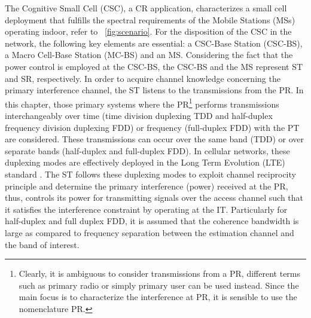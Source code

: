 The Cognitive Small Cell (CSC), a CR application, characterizes a small cell deployment that fulfills the spectral requirements of the Mobile Stations (MSs) operating indoor, refer to \figurename~\ref{fig:scenario}.
For the disposition of the CSC in the network, the following key elements are essential: a CSC-Base Station (CSC-BS), a Macro Cell-Base Station (MC-BS) and an MS. 
Considering the fact that the power control is employed at the CSC-BS, the CSC-BS and the MS represent ST and SR, respectively. In order to acquire channel knowledge concerning the primary interference channel, the ST listens to the transmissions from the PR. In this chapter, those primary systems where the PR\footnote{Clearly, it is ambiguous to consider transmissions from a PR, different terms such as primary radio or simply primary user can be used instead. Since the main focus is to characterize the interference at PR, it is sensible to use the nomenclature PR.} performs transmissions interchangeably over time (time division duplexing TDD and half-duplex frequency division duplexing FDD) or frequency (full-duplex FDD) with the PT are considered. These transmissions can occur over the same band (TDD) or over separate bands (half-duplex and full-duplex FDD). 
In cellular networks, these duplexing modes are effectively deployed in the Long Term Evolution (LTE) standard \cite{LTE09}. The ST follows these duplexing modes to exploit channel reciprocity principle and determine the primary interference (power) received at the PR, thus, controls its power for transmitting signals over the access channel such that it satisfies the interference constraint by operating at the IT. Particularly for half-duplex and full duplex FDD, it is assumed that the coherence bandwidth is large as compared to frequency separation between the estimation channel and the band of interest. 
